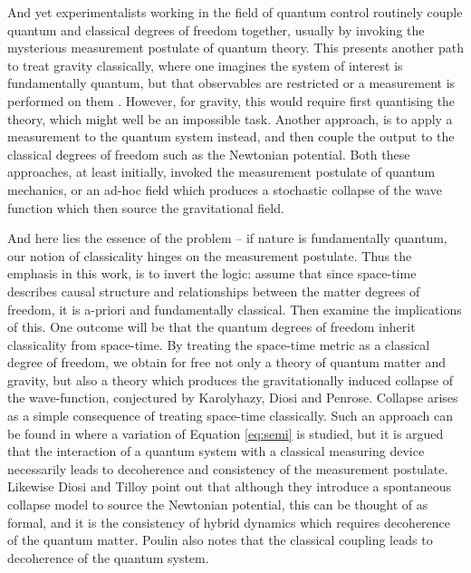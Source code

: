 \documentclass[aps,pra,showpacs,citeautoscript,amsmath,amssymb,floatfix,superscriptaddress,bbm, verbatim,amsfonts,changes,10pt,nofootinbib,longbibliography]{revtex4-1}
\begin{document}
And yet experimentalists working in the field of quantum control routinely couple quantum and classical degrees of freedom together, usually by invoking the mysterious measurement postulate of quantum theory. This presents another path to treat gravity classically, where one 
imagines the system of interest is fundamentally quantum, but that observables are restricted or a measurement is performed on them
\cite{jauch1964problem,diosi1998coupling,diosi2000quantum,peres2001hybrid}. However, for gravity, this would require first quantising the theory, which might well be an impossible task. Another approach, is to apply a measurement to the quantum system instead, and then couple the output to the classical degrees of freedom such as the Newtonian potential\cite{kafri2014classical,tilloy2016sourcing,tilloy2017principle,dowker2008dynamical}.  Both these approaches, at least initially, invoked the measurement postulate of quantum mechanics, or an ad-hoc field which produces a stochastic collapse of the wave function
\cite{pearle-csl1,grw85,grw86,gisin-percival,adler2001generalized,sep-qm-collapse} which then source the gravitational field. 

And here lies the essence of the problem -- if nature is fundamentally quantum, our notion of classicality hinges on the measurement postulate. Thus the emphasis in this work, is to invert the logic: assume that since space-time describes causal structure and relationships between the matter degrees of freedom, it is a-priori and fundamentally classical. Then examine the implications of this. One outcome will be that the quantum degrees of freedom inherit classicality from space-time. By treating the space-time metric as a classical degree of freedom, we obtain for free not only a 
theory of quantum matter and gravity, but also a theory which produces the
 gravitationally induced collapse of the wave-function, conjectured by Karolyhazy, Diosi and Penrose\cite{karolyhazy1966gravitation,diosi1989models,penrose1996gravity}\cite{penrose_foot}. Collapse arises as a simple consequence of treating space-time classically. Such an approach can be found in \cite{hall2005interacting} where a variation of Equation \eqref{eq:semi} is studied, but it is argued that the interaction of a quantum system with a classical measuring device necessarily leads to decoherence and consistency of the measurement postulate. Likewise Diosi and Tilloy\cite{tilloy2016sourcing,tilloy2017principle} point out that although they introduce a spontaneous collapse model to source the Newtonian potential, this can be thought of as formal, and it is the consistency of hybrid dynamics which requires decoherence of the quantum matter.  Poulin \cite{poulinKITP} also notes that the classical coupling leads to decoherence of the quantum system.
 
\end{document}
